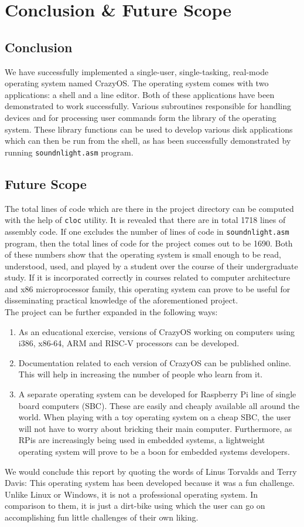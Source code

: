 \chapter{\centering Conclusion \& Future Scope}
\section{Conclusion}
We have successfully implemented a single-user, single-tasking, real-mode operating system named CrazyOS. The operating system comes with two applications: a shell and a line editor. Both of these applications have been demonstrated to work successfully. Various subroutines responsible for handling devices and for processing user commands form the library of the operating system. These library functions can be used to develop various disk applications which can then be run from the shell, as has been successfully demonstrated by running \texttt{soundnlight.asm} program.

\section{Future Scope}
The total lines of code which are there in the project directory can be computed with the help of \texttt{cloc} utility. It is revealed that there are in total 1718 lines of assembly code. If one excludes the number of lines of code in \texttt{soundnlight.asm} program, then the total lines of code for the project comes out to be 1690. Both of these numbers show that the operating system is small enough to be read, understood, used, and played by a student over the course of their undergraduate study. If it is incorporated correctly in courses related to computer architecture and x86 microprocessor family, this operating system can prove to be useful for disseminating practical knowledge of the aforementioned project.\\
The project can be further expanded in the following ways:
\begin{enumerate}
  \item As an educational exercise, versions of CrazyOS working on computers using i386, x86-64, ARM and RISC-V processors can be developed.
  \item Documentation related to each version of CrazyOS can be published online. This will help in increasing the number of people who learn from it.
  \item A separate operating system can be developed for Raspberry Pi line of single board computers (SBC). These are easily and cheaply available all around the world. When playing with a toy operating system on a cheap SBC, the user will not have to worry about bricking their main computer. Furthermore, as RPis are increasingly being used in embedded systems, a lightweight operating system will prove to be a boon for embedded systems developers.
\end{enumerate}
We would conclude this report by quoting the words of Linus Torvalds and Terry Davis: This operating system has been developed because it was a fun challenge. Unlike Linux or Windows, it is not a professional operating system. In comparison to them, it is just a dirt-bike using which the user can go on accomplishing fun little challenges of their own liking. 